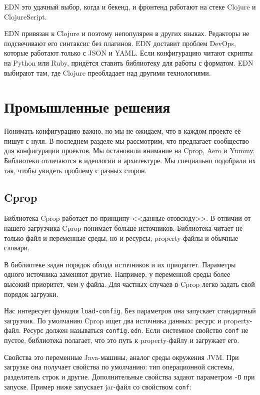 EDN это удачный выбор, когда и бекенд, и фронтенд работают на стеке Clojure и
ClojureScript.

EDN привязан к Clojure и поэтому непопулярен в других языках. Редакторы не
подсвечивают его синтаксис без плагинов. EDN доставит проблем DevOps, которые
работают только с JSON и YAML. Если конфигурацию читают скрипты на Python или
Ruby, придётся ставить библиотеку для работы с форматом. EDN выбирают там, где
Clojure преобладает над другими технологиями.

\section{Промышленные решения}

Понимать конфигурацию важно, но мы не ожидаем, что в каждом проекте её пишут с
нуля. В последнем разделе мы рассмотрим, что предлагает сообщество для
конфигурации проектов. Мы остановили внимание на Cprop, Aero и Yummy. Библиотеки
отличаются в идеологии и архитектуре. Мы специально подобрали их так, чтобы
увидеть проблему с разных сторон.

\subsection{Cprop}


Библиотека Cprop работает по принципу
<<данные отовсюду>>. В отличии от нашего загрузчика Cprop понимает больше
источников. Библиотека читает не только файл и переменные среды, но и ресурсы,
property-файлы и обычные словари.

В библиотеке задан порядок обхода источников и их приоритет. Параметры одного
источника заменяют другие. Например, у переменной среды более высокий приоритет,
чем у файла. Для частных случаев в Cprop легко задать свой порядок загрузки.

Нас интересует функция \verb|load-config|. Без параметров она запускает
стандартный загрузчик. По умолчанию Cprop ищет два источника данных: ресурс и
property-файл. Ресурс должен называться \verb|config.edn|. Если системное
свойство \verb|conf| не пустое, библиотека полагает, что это путь к
property-файлу и загружает его.

Свойства это переменные Java-машины, аналог среды окружения JVM. При загрузке
она получает свойства по умолчанию: тип операционной системы, разделитель строк
и другие. Дополнительные свойства задают параметром \verb|-D| при
запуске. Пример ниже запускает jar-файл со свойством \verb|conf|:

